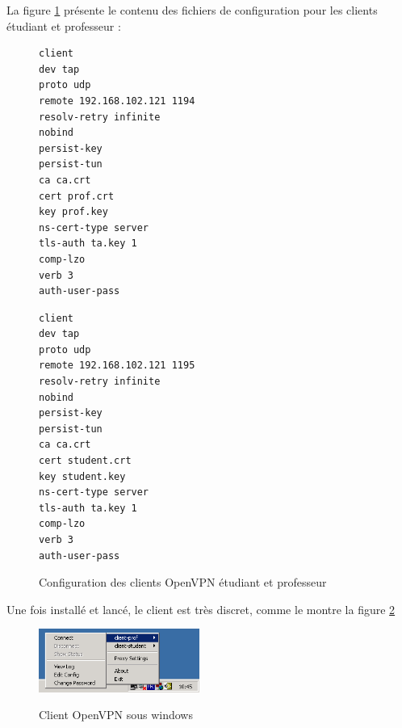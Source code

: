 La figure \ref{config_openvpn_client_student} présente le contenu des fichiers de configuration pour les clients étudiant et professeur :

\begin{figure}[H]
	\begin{minipage}{0.50\textwidth}
		\begin{flushleft}
			\begin{minipage}{0.90\textwidth}
				\begin{lstlisting}[frame=trBL]
client
dev tap
proto udp
remote 192.168.102.121 1194
resolv-retry infinite
nobind
persist-key
persist-tun
ca ca.crt
cert prof.crt
key prof.key
ns-cert-type server
tls-auth ta.key 1
comp-lzo
verb 3
auth-user-pass
				\end{lstlisting}
			\end{minipage}
		\end{flushleft}
	\end{minipage}
	\begin{minipage}{0.49\textwidth}
		\begin{flushright}
			\begin{minipage}{0.90\textwidth}
				\begin{lstlisting}[frame=trBL]
client
dev tap
proto udp
remote 192.168.102.121 1195
resolv-retry infinite
nobind
persist-key
persist-tun
ca ca.crt
cert student.crt
key student.key
ns-cert-type server
tls-auth ta.key 1
comp-lzo
verb 3
auth-user-pass
				\end{lstlisting}
			\end{minipage}
		\end{flushright}
	\end{minipage}
	\caption{Configuration des clients OpenVPN étudiant et professeur}
	\label{config_openvpn_client_student}
\end{figure}

Une fois installé et lancé, le client est très discret, comme le montre la figure \ref{openvpn_screen_windows}

\begin{figure}[H]
	\begin{center}
		\includegraphics[width=0.47\textwidth]{partie_2/images/openvpn-client-connect.png}\\
	\end{center}
	\caption{Client OpenVPN sous windows}
	\label{openvpn_screen_windows}
\end{figure}


